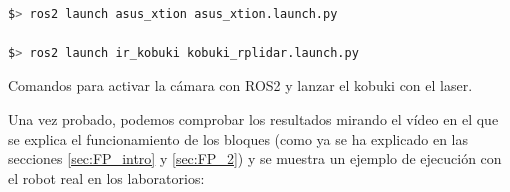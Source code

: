 \begin{code}[H]
    \begin{lstlisting}[language=bash]

$> ros2 launch asus_xtion asus_xtion.launch.py

$> ros2 launch ir_kobuki kobuki_rplidar.launch.py
    \end{lstlisting}
    \caption[Comandos para lanzar kobuki y cámara]{Comandos para activar la cámara con ROS2 y lanzar el kobuki con el laser.}
    \label{cod:coms_kobuki_laser_cam}
\end{code}

Una vez probado, podemos comprobar los resultados mirando el vídeo en el que se explica el funcionamiento de los bloques (como ya se ha explicado en las
secciones \ref{sec:FP_intro} y \ref{sec:FP_2}) y se muestra un ejemplo de ejecución con el robot real en los laboratorios:


